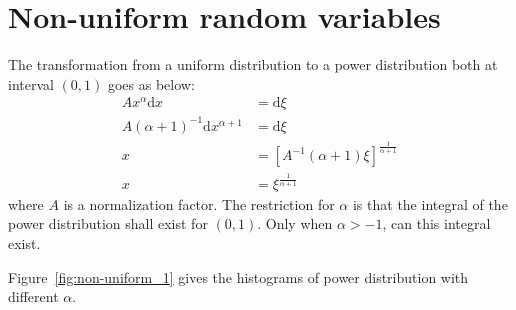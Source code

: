 \documentclass[paper=a4, fontsize=11pt]{scrartcl} %
\numberwithin{equation}{section} %
\numberwithin{figure}{section} %
\numberwithin{table}{section} %
\begin{document}

\section{Non-uniform random variables}

The transformation from a uniform distribution to a power distribution both at interval \(\left( 0,1 \right)\) goes as below:
\begin{align*}
	Ax^\alpha\mathrm{d}x&=\mathrm{d}\xi\\
	A\left( \alpha+1 \right)^{-1}\mathrm{d}x^{\alpha+1}&=\mathrm{d}\xi\\
	x&=\left[A^{-1} \left( \alpha+1 \right)\xi\right]^{\frac{1}{\alpha+1}}\\
	x&=\xi^{\frac{1}{\alpha+1}}
\end{align*}
where \(A\) is a normalization factor. The restriction for \(\alpha\) is that the integral of the power distribution shall exist for \(\left( 0,1 \right)\). Only when \(\alpha>-1\), can this integral exist. \par
Figure~\ref{fig:non-uniform_1} gives the histograms of power distribution with different \(\alpha\).
\end{document}
